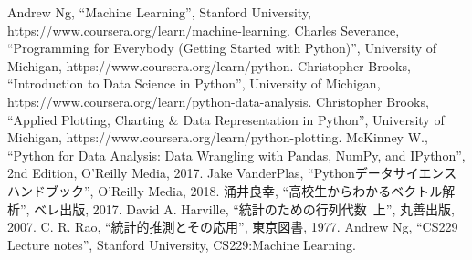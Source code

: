 \begin{thebibliography}{99}
 Andrew Ng, ``Machine Learning'', Stanford University, https://www.coursera.org/learn/machine-learning.
 Charles Severance, ``Programming for Everybody (Getting Started with Python)'', University of Michigan, https://www.coursera.org/learn/python.
 Christopher Brooks, ``Introduction to Data Science in Python'', University of Michigan, https://www.coursera.org/learn/python-data-analysis.
 Christopher Brooks, ``Applied Plotting, Charting \& Data Representation in Python'', University of Michigan, https://www.coursera.org/learn/python-plotting.
 McKinney W., ``Python for Data Analysis: Data Wrangling with Pandas, NumPy, and IPython'', 2nd Edition, O'Reilly Media, 2017.
 Jake VanderPlas, ``Pythonデータサイエンスハンドブック'', O'Reilly Media, 2018.
 涌井良幸, ``高校生からわかるベクトル解析'', ベレ出版, 2017.
 David A. Harville, ``統計のための行列代数~上'', 丸善出版, 2007.
 C. R. Rao, ``統計的推測とその応用'', 東京図書, 1977.
 Andrew Ng, ``CS229 Lecture notes'', Stanford University, CS229:Machine Learning.
\end{thebibliography}